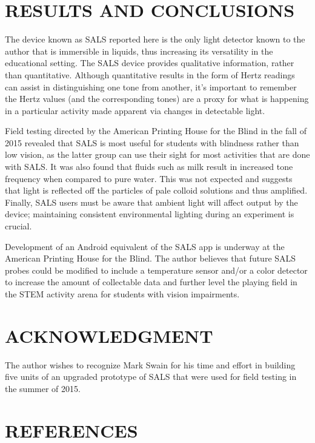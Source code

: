 \documentclass[11.5pt]{sig-alternate} %
\begin{document}
\begin{large}
\section*{RESULTS AND CONCLUSIONS}

The device known as SALS reported here is the only light detector known to the author that is immersible in liquids, thus increasing its versatility in the educational setting. The SALS device provides qualitative information, rather than quantitative. Although quantitative results in the form of Hertz readings can assist in distinguishing one tone from another, it’s important to remember the Hertz values (and the corresponding tones) are a proxy for what is happening in a particular activity made apparent via changes in detectable light. 

Field testing directed by the American Printing House for the Blind in the fall of 2015 revealed that SALS is most useful for students with blindness rather than low vision, as the latter group can use their sight for most activities that are done with SALS. It was also found that fluids such as milk result in increased tone frequency when compared to pure water. This was not expected and suggests that light is reflected off the particles of pale colloid solutions and thus amplified. Finally, SALS users must be aware that ambient light will affect output by the device; maintaining consistent environmental lighting during an experiment is crucial. 

Development of an Android equivalent of the SALS app is underway at the American Printing House for the Blind. The author believes that future SALS probes could be modified to include a temperature sensor and/or a color detector to increase the amount of collectable data and further level the playing field in the STEM activity arena for students with vision impairments. 

\section*{ACKNOWLEDGMENT}

The author wishes to recognize Mark Swain for his time and effort in building five units of an upgraded prototype of SALS that were used for field testing in the summer of 2015.

\end{large}
\clearpage
\section*{REFERENCES}\par 
\end{document}
